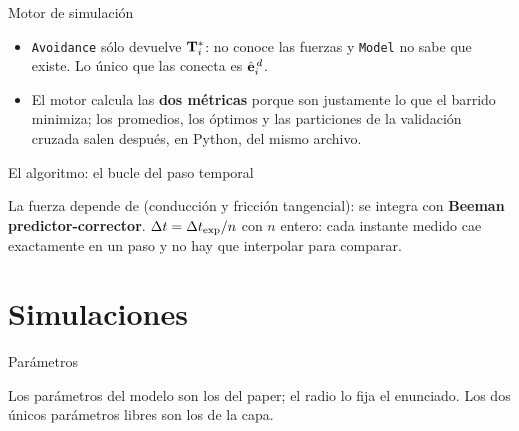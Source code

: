 \documentclass[aspectratio=169,11pt]{beamer}
\begin{document}
\begin{frame}{Motor de simulación}
    \centering
    \vspace{-0.2em}
    \resizebox{0.90\textwidth}{!}{}\\[0.8em]
    \begin{minipage}{0.94\textwidth}
        \footnotesize\sloppy
        \begin{itemize}\setlength{\itemsep}{0.35em}
            \item \texttt{Avoidance} sólo devuelve $\mathbf{T}_i^{*}$: no conoce las fuerzas
                  y \texttt{Model} no sabe que existe. Lo único que las conecta es
                  $\hat{\mathbf{e}}_i^{\,d}$.
            \item El motor calcula las \textbf{dos métricas} porque son justamente lo
                  que el barrido minimiza; los promedios, los óptimos y las
                  particiones de la validación cruzada salen después, en Python,
                  del mismo archivo.
        \end{itemize}
    \end{minipage}
\end{frame}

\begin{frame}{El algoritmo: el bucle del paso temporal}
    \vspace{-0.4em}
    \begin{center}
        \resizebox{0.72\textwidth}{!}{}
    \end{center}
    \vspace{-0.6em}
    \centering
    {\small La fuerza depende de \vv{} (conducción y fricción tangencial): se integra con
    \textbf{Beeman predictor-corrector}. \alert{$\Delta t = \Delta t_{\text{exp}}/n$ con $n$ entero}:
    cada instante medido cae exactamente en un paso y no hay que interpolar para comparar.}
\end{frame}

\section{Simulaciones}

\begin{frame}{Parámetros}
    \vspace{-0.2em}
    \begin{center}
        \resizebox*{!}{5.6cm}{}
    \end{center}
    \vspace{-0.6em}
    \begin{center}
    {\scriptsize\color{gris}
     Los parámetros del modelo son los del paper; el radio lo fija el
     enunciado. Los dos únicos parámetros libres son los de la capa.}
    \end{center}
\end{frame}
\end{document}
